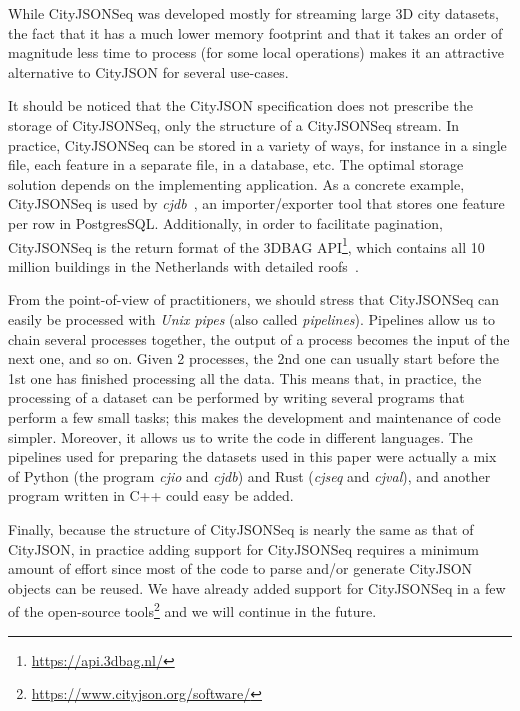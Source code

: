 \documentclass[11pt,halfparskip,parskip=half]{scrartcl}
\begin{document}
While CityJSONSeq was developed mostly for streaming large 3D city datasets, the fact that it has a much lower memory footprint and that it takes an order of magnitude less time to process (for some local operations) makes it an attractive alternative to CityJSON for several use-cases.

%

It should be noticed that the CityJSON specification does not prescribe the storage of CityJSONSeq, only the structure of a CityJSONSeq stream.
In practice, CityJSONSeq can be stored in a variety of ways, for instance in a single file, each feature in a separate file, in a database, etc.
The optimal storage solution depends on the implementing application.
As a concrete example, CityJSONSeq is used by \emph{cjdb}~\citep{Powalka23}, an importer/exporter tool that stores one feature per row in PostgresSQL.
Additionally, in order to facilitate pagination, CityJSONSeq is the return format of the 3DBAG API\footnote{\url{https://api.3dbag.nl/}}, which contains all 10 million buildings in the Netherlands with detailed roofs~\citep{Peters22}.

%

From the point-of-view of practitioners, we should stress that CityJSONSeq can easily be processed with \emph{Unix pipes} (also called \emph{pipelines}).
Pipelines allow us to chain several processes together, the output of a process becomes the input of the next one, and so on.
Given 2 processes, the 2nd one can usually start before the 1st one has finished processing all the data.
This means that, in practice, the processing of a dataset can be performed by writing several programs that perform a few small tasks; this makes the development and maintenance of code simpler.
Moreover, it allows us to write the code in different languages.
The pipelines used for preparing the datasets used in this paper were actually a mix of Python (the program \emph{cjio} and \emph{cjdb}) and Rust (\emph{cjseq} and \emph{cjval}), and another program written in C++ could easy be added.

%

Finally, because the structure of CityJSONSeq is nearly the same as that of CityJSON, in practice adding support for CityJSONSeq requires a minimum amount of effort since most of the code to parse and/or generate CityJSON objects can be reused.
We have already added support for CityJSONSeq in a few of the open-source tools\footnote{\url{https://www.cityjson.org/software/}} and we will continue in the future.




\end{document}
